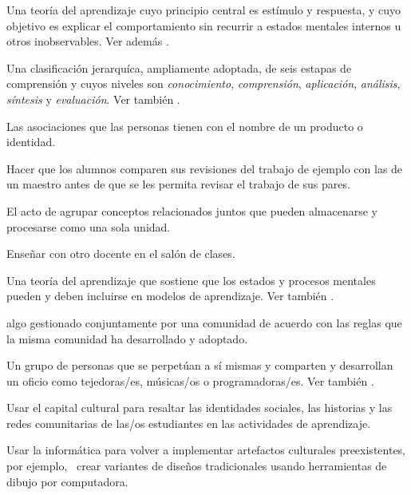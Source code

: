 \begin{description}
 Una teoría del aprendizaje cuyo principio central
es estímulo y respuesta, y cuyo objetivo es explicar el comportamiento sin recurrir
a estados mentales internos u otros inobservables. Ver
además .

 Una clasificación jerarquíca, ampliamente adoptada, 
de seis estapas de comprensión y cuyos niveles son \emph{conocimiento},
\emph{comprensión}, \emph{aplicación}, \emph{análisis}, \emph{síntesis} y
\emph{evaluación}. 
Ver también .

 Las asociaciones que las personas tienen con el nombre de un producto o
identidad.

 Hacer que los alumnos comparen sus 
revisiones del trabajo de ejemplo con las de un maestro antes de que 
se les permita revisar el trabajo de sus pares.

 El acto de agrupar conceptos relacionados juntos
que pueden almacenarse y procesarse como una sola unidad.

 Enseñar con otro docente en el
salón de clases.





 Una teoría del aprendizaje que sostiene que los estados 
y procesos mentales pueden y deben incluirse en modelos de aprendizaje. Ver también
.

 algo gestionado conjuntamente por una comunidad 
de acuerdo con las reglas que la misma comunidad ha desarrollado y adoptado.

 Un grupo de personas que se perpetúan a sí mismas 
y comparten y desarrollan un oficio como tejedoras/es, músicas/os o programadoras/es. Ver también
.

 Usar el capital cultural 
para resaltar las identidades sociales, las historias y las redes comunitarias de 
las/os estudiantes en las actividades de aprendizaje.

 Usar la informática 
para volver a implementar artefactos culturales preexistentes, por ejemplo, 
\ crear variantes de diseños tradicionales usando herramientas de dibujo por computadora.



\end{description}

